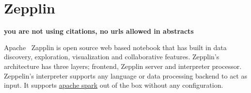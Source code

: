 \section{Zepplin}

{\bf you are not using citations, no urls allowed in abstracts}

Apache~\cite{hid-sp18-413-Zepplin} Zapplin is open source web based
notebook that has built in data discovery, exploration, visualization
and collaborative features. Zepplin’s architecture has three layers;
frontend, Zepplin server and interpreter processor. Zeppelin’s
interpreter supports any language or data processing backend to act as
input. It supports
\href{https://en.wikipedia.org/wiki/Apache_Spark}{apache spark} out of
the box without any configuration.
